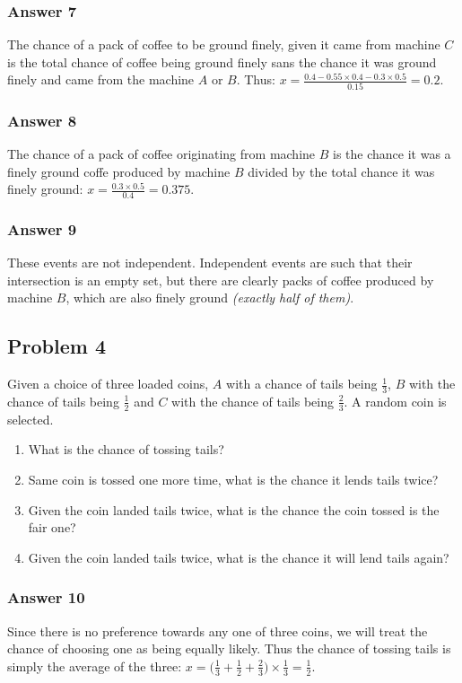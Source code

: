 \documentclass[11pt]{article}
\begin{document}
\subsubsection{Answer 7}
\label{sec-1-3-1}
The chance of a pack of coffee to be ground finely, given it came from machine
$C$ is the total chance of coffee being ground finely sans the chance it
was ground finely and came from the machine $A$ or $B$.  Thus:
$x = \frac{0.4 - 0.55 \times 0.4 - 0.3 \times 0.5}{0.15} = 0.2$.
\subsubsection{Answer 8}
\label{sec-1-3-2}
The chance of a pack of coffee originating from machine $B$ is the chance
it was a finely ground coffe produced by machine $B$ divided by the total
chance it was finely ground: $x = \frac{0.3 \times 0.5}{0.4} = 0.375$.
\subsubsection{Answer 9}
\label{sec-1-3-3}
These events are not independent.  Independent events are such that their
intersection is an empty set, but there are clearly packs of coffee produced
by machine $B$, which are also finely ground \emph{(exactly half of them)}.

\subsection{Problem 4}
\label{sec-1-4}
Given a choice of three loaded coins, $A$ with a chance of tails being $\frac{1}{3}$,
$B$ with the chance of tails being $\frac{1}{2}$ and $C$ with the chance of tails
being $\frac{2}{3}$.  A random coin is selected.

\begin{enumerate}
\item What is the chance of tossing tails?
\item Same coin is tossed one more time, what is the chance it lends tails twice?
\item Given the coin landed tails twice, what is the chance the coin tossed
is the fair one?
\item Given the coin landed tails twice, what is the chance it will lend tails
again?
\end{enumerate}

\subsubsection{Answer 10}
\label{sec-1-4-1}
Since there is no preference towards any one of three coins, we will treat
the chance of choosing one as being equally likely.  Thus the chance of
tossing tails is simply the average of the three:
$x = \Big(\frac{1}{3} + \frac{1}{2} + \frac{2}{3}\Big) \times \frac{1}{3} = \frac{1}{2}$.
\end{document}
